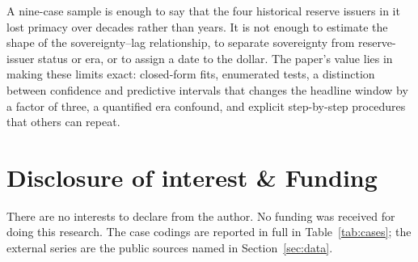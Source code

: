 \documentclass[11pt,letterpaper]{article}
\theoremstyle{definition}
\theoremstyle{plain}
\begin{document}
A nine-case sample is enough to say that the four historical reserve issuers in it lost primacy over decades rather than years. It is not enough to estimate the shape of the sovereignty--lag relationship, to separate sovereignty from reserve-issuer status or era, or to assign a date to the dollar. The paper's value lies in making these limits exact: closed-form fits, enumerated tests, a distinction between confidence and predictive intervals that changes the headline window by a factor of three, a quantified era confound, and explicit step-by-step procedures that others can repeat.

\section*{Disclosure of interest \& Funding}
There are no interests to declare from the author. No funding was received for doing this research. The case codings are reported in full in Table~\ref{tab:cases}; the external series are the public sources named in Section~\ref{sec:data}.
\end{document}

